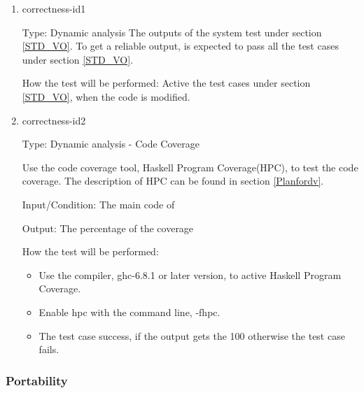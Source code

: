 \documentclass[12pt, titlepage]{article}
\begin{document}
\begin{enumerate} 

\item{correctness-id1\\} 

Type: Dynamic analysis
The outputs of the system test under section \ref{STD_VO}. To get a
reliable output, \progname is expected to pass all the test cases under section \ref{STD_VO}.

How the test will be performed: Active the test cases under section
\ref{STD_VO}, when the code is modified.

\item{correctness-id2\\}

Type: Dynamic analysis - Code Coverage 

Use the code coverage tool, Haskell Program Coverage(HPC), to test the code
coverage. The description of HPC can be found in section \ref{Planfordv}.

Input/Condition: The main code of \progname

Output: The percentage of the coverage 

How the test will be performed:

\begin{itemize} 
\item Use the compiler, ghc-6.8.1 or later version, to active Haskell Program
Coverage.
\item Enable hpc with the command line, -fhpc.
\item The test case success, if the output gets the 100%
otherwise
the test case fails. 
\end{itemize}
\end{enumerate} 


\subsubsection{Portability} 
\end{document}
